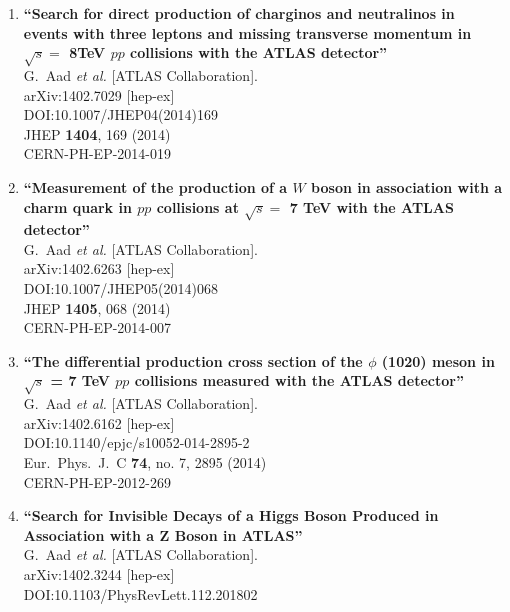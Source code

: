 \documentclass{article}
\begin{document}
\begin{enumerate}
\item%
{\bf ``Search for direct production of charginos and neutralinos in events with three leptons and missing transverse momentum in $\sqrt{s} =$ 8TeV $pp$ collisions with the ATLAS detector''}
  \\{}G.~Aad {\it et al.} [ATLAS Collaboration].
  \\{}arXiv:1402.7029 [hep-ex]
  \\{}DOI:10.1007/JHEP04(2014)169
  \\{}JHEP {\bf 1404}, 169 (2014)
  \\{}CERN-PH-EP-2014-019
\item%
{\bf ``Measurement of the production of a $W$ boson in association with a charm quark in $pp$ collisions at $\sqrt{s} =$ 7 TeV with the ATLAS detector''}
  \\{}G.~Aad {\it et al.} [ATLAS Collaboration].
  \\{}arXiv:1402.6263 [hep-ex]
  \\{}DOI:10.1007/JHEP05(2014)068
  \\{}JHEP {\bf 1405}, 068 (2014)
  \\{}CERN-PH-EP-2014-007
\item%
{\bf ``The differential production cross section of the $\phi $ (1020) meson in $\sqrt{s}$ = 7 TeV $pp$ collisions measured with the ATLAS detector''}
  \\{}G.~Aad {\it et al.} [ATLAS Collaboration].
  \\{}arXiv:1402.6162 [hep-ex]
  \\{}DOI:10.1140/epjc/s10052-014-2895-2
  \\{}Eur.\ Phys.\ J.\ C {\bf 74}, no. 7, 2895 (2014)
  \\{}CERN-PH-EP-2012-269
\item%
{\bf ``Search for Invisible Decays of a Higgs Boson Produced in Association with a Z Boson in ATLAS''}
  \\{}G.~Aad {\it et al.} [ATLAS Collaboration].
  \\{}arXiv:1402.3244 [hep-ex]
  \\{}DOI:10.1103/PhysRevLett.112.201802

\end{enumerate}
\end{document}
